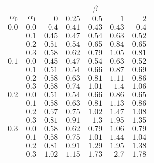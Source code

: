 \begin{tabular}{rr|rrrrr}
\hline\hline
 && \multicolumn{5}{c}{$\beta$}\\
 $\alpha_0$ & $\alpha_1$ & $0$ & $0.25$ & $0.5$ & $1$ & $2$ \\ 
 \hline
$0.0$ & $0.0$ & $0.4$ & $0.41$ & $0.43$ & $0.43$ & $0.4$\\ 
 & $0.1$ & $0.45$ & $0.47$ & $0.54$ & $0.63$ & $0.52$\\ 
 & $0.2$ & $0.51$ & $0.54$ & $0.65$ & $0.84$ & $0.65$\\ 
 & $0.3$ & $0.58$ & $0.62$ & $0.79$ & $1.05$ & $0.81$\\ 
\hline 
 $0.1$ & $0.0$ & $0.45$ & $0.47$ & $0.54$ & $0.63$ & $0.52$\\ 
 & $0.1$ & $0.51$ & $0.54$ & $0.66$ & $0.87$ & $0.69$\\ 
 & $0.2$ & $0.58$ & $0.63$ & $0.81$ & $1.11$ & $0.86$\\ 
 & $0.3$ & $0.68$ & $0.74$ & $1.01$ & $1.4$ & $1.06$\\ 
\hline 
 $0.2$ & $0.0$ & $0.51$ & $0.54$ & $0.66$ & $0.86$ & $0.65$\\ 
 & $0.1$ & $0.58$ & $0.63$ & $0.81$ & $1.13$ & $0.86$\\ 
 & $0.2$ & $0.67$ & $0.75$ & $1.02$ & $1.47$ & $1.08$\\ 
 & $0.3$ & $0.81$ & $0.91$ & $1.3$ & $1.95$ & $1.35$\\ 
\hline 
 $0.3$ & $0.0$ & $0.58$ & $0.62$ & $0.79$ & $1.06$ & $0.79$\\ 
 & $0.1$ & $0.68$ & $0.75$ & $1.01$ & $1.44$ & $1.04$\\ 
 & $0.2$ & $0.81$ & $0.91$ & $1.29$ & $1.95$ & $1.38$\\ 
 & $0.3$ & $1.02$ & $1.15$ & $1.73$ & $2.7$ & $1.78$\\ 
 \hline 
 \end{tabular}